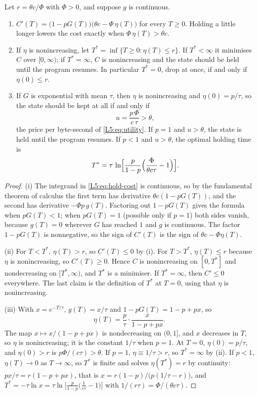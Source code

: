 \begin{proposition}\label{L5:prop:hold}
Let $r=\theta c/\Phi$ with $\Phi>0$, and suppose $g$ is continuous.
\begin{enumerate}[label=(\roman*)]
\item $C'(T)=\bigl(1-pG(T)\bigr)\bigl(\theta c-\Phi\,\eta(T)\bigr)$ for every $T\ge0$.
  Holding a little longer lowers the cost exactly when $\Phi\,\eta(T)>\theta c$.
\item If $\eta$ is nonincreasing, let $T^*=\inf\{T\ge0:\eta(T)\le r\}$. If
  $T^*<\infty$ it minimises $C$ over $[0,\infty)$; if $T^*=\infty$, $C$ is nonincreasing
  and the state should be held until the program resumes. In particular $T^*=0$, drop at
  once, if and only if $\eta(0)\le r$.
\item If $G$ is exponential with mean $\tau$, then $\eta$ is nonincreasing and
  $\eta(0)=p/\tau$, so the state should be kept at all if and only if
  \[
    u=\frac{p\,\Phi}{c\,\tau}>\theta ,
  \]
  the price per byte-second of \eqref{L5:eq:utility}. If $p=1$ and $u>\theta$, the
  state is held until the program resumes. If $p<1$ and $u>\theta$, the optimal holding
  time is
  \[
    T^*=\tau\,\ln\Bigl[\frac{p}{1-p}\Bigl(\frac{\Phi}{\theta c\tau}-1\Bigr)\Bigr].
  \]
\end{enumerate}
\end{proposition}

\begin{proof}
(i) The integrand in \eqref{L5:eq:hold-cost} is continuous, so by the fundamental
theorem of calculus the first term has derivative $\theta c(1-pG(T))$, and the second
has derivative $-\Phi p\,g(T)$. Factoring out $1-pG(T)$ gives the formula when
$pG(T)<1$; when $pG(T)=1$ (possible only if $p=1$) both sides vanish, because
$g(T)=0$ wherever $G$ has reached $1$ and $g$ is continuous. The factor $1-pG(T)$ is
nonnegative, so the sign of $C'(T)$ is the sign of $\theta c-\Phi\eta(T)$.

(ii) For $T<T^*$, $\eta(T)>r$, so $C'(T)\le0$ by (i). For $T>T^*$, $\eta(T)\le r$
because $\eta$ is nonincreasing, so $C'(T)\ge0$. Hence $C$ is nonincreasing on
$[0,T^*]$ and nondecreasing on $[T^*,\infty)$, and $T^*$ is a minimiser. If
$T^*=\infty$, then $C'\le0$ everywhere. The last claim is the definition of $T^*$ at
$T=0$, using that $\eta$ is nonincreasing.

(iii) With $x=e^{-T/\tau}$, $g(T)=x/\tau$ and $1-pG(T)=1-p+px$, so
\[
  \eta(T)=\frac{p}{\tau}\cdot\frac{x}{1-p+px}.
\]
The map $x\mapsto x/(1-p+px)$ is nondecreasing on $(0,1]$, and $x$ decreases in $T$,
so $\eta$ is nonincreasing; it is the constant $1/\tau$ when $p=1$. At $T=0$,
$\eta(0)=p/\tau$, and $\eta(0)>r$ is $p\Phi/(c\tau)>\theta$. If $p=1$, $\eta\equiv1/\tau>r$,
so $T^*=\infty$ by (ii). If $p<1$, $\eta(T)\to0$ as $T\to\infty$, so $T^*$ is finite and
solves $\eta(T^*)=r$ by continuity:
$px/\tau=r(1-p+px)$, that is $x=r(1-p)/\bigl(p(1/\tau-r)\bigr)$, and
$T^*=-\tau\ln x=\tau\ln\bigl[\frac{p}{1-p}\bigl(\frac{1}{r\tau}-1\bigr)\bigr]$ with
$1/(r\tau)=\Phi/(\theta c\tau)$.
\end{proof}


